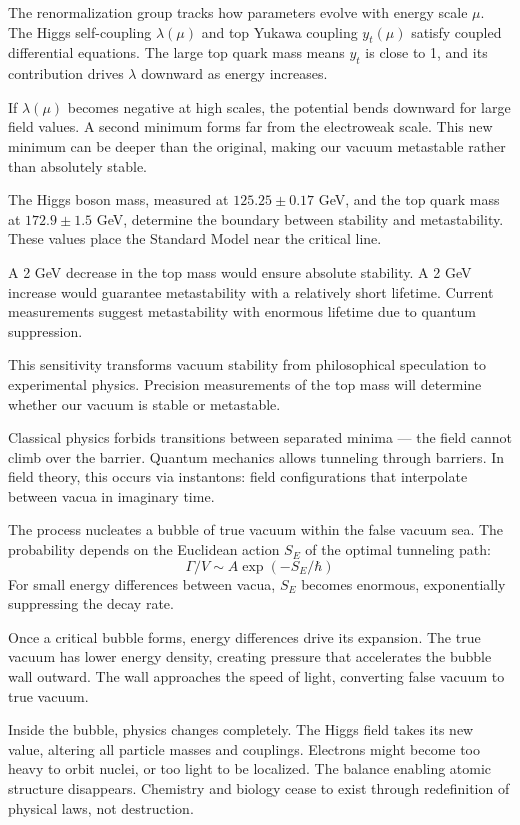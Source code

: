 The renormalization group tracks how parameters evolve with energy scale $\mu$. The Higgs self-coupling $\lambda(\mu)$ and top Yukawa coupling $y_t(\mu)$ satisfy coupled differential equations. The large top quark mass means $y_t$ is close to 1, and its contribution drives $\lambda$ downward as energy increases.

If $\lambda(\mu)$ becomes negative at high scales, the potential bends downward for large field values. A second minimum forms far from the electroweak scale. This new minimum can be deeper than the original, making our vacuum metastable rather than absolutely stable.

The Higgs boson mass, measured at $125.25 \pm 0.17$ GeV, and the top quark mass at $172.9 \pm 1.5$ GeV, determine the boundary between stability and metastability. These values place the Standard Model near the critical line.

A 2 GeV decrease in the top mass would ensure absolute stability. A 2 GeV increase would guarantee metastability with a relatively short lifetime. Current measurements suggest metastability with enormous lifetime due to quantum suppression.

This sensitivity transforms vacuum stability from philosophical speculation to experimental physics. Precision measurements of the top mass will determine whether our vacuum is stable or metastable.

Classical physics forbids transitions between separated minima — the field cannot climb over the barrier. Quantum mechanics allows tunneling through barriers. In field theory, this occurs via instantons: field configurations that interpolate between vacua in imaginary time.

The process nucleates a bubble of true vacuum within the false vacuum sea. The probability depends on the Euclidean action $S_E$ of the optimal tunneling path:
\[
\Gamma/V \sim A \exp(-S_E/\hbar)
\]
For small energy differences between vacua, $S_E$ becomes enormous, exponentially suppressing the decay rate.

Once a critical bubble forms, energy differences drive its expansion. The true vacuum has lower energy density, creating pressure that accelerates the bubble wall outward. The wall approaches the speed of light, converting false vacuum to true vacuum.

Inside the bubble, physics changes completely. The Higgs field takes its new value, altering all particle masses and couplings. Electrons might become too heavy to orbit nuclei, or too light to be localized. The balance enabling atomic structure disappears. Chemistry and biology cease to exist through redefinition of physical laws, not destruction.

